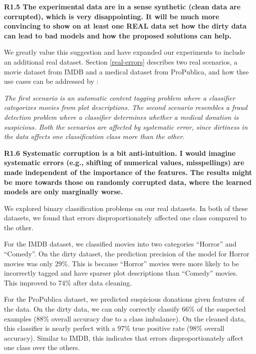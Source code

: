 \vspace{0.5em}

\noindent\textbf{R1.5 The experimental data are in a sense synthetic (clean data are corrupted), which is very disappointing. It will be much more convincing to show on at least one REAL data set how the dirty data can lead to bad models and how the proposed solutions can help.}

\noindent We greatly value this suggestion and have expanded our experiments to include an additional real dataset.
Section \ref{real-errors} describes two real scenarios, a movie dataset from IMDB and a medical dataset from ProPublica, and how thse use cases can be addressed by \sys:

\emph{The first scenario is an automatic content tagging problem where a classifier categorizes movies from plot descriptions.
The second scenario resembles a fraud detection problem where a classifier determines whether a medical donation is suspicious.
Both the scenarios are affected by systematic error, since dirtiness in the data affects one classification class more than the other.}

\vspace{0.5em}

\noindent\textbf{R1.6 Systematic corruption is a bit anti-intuition. I would imagine systematic errors (e.g., shifting of numerical values, misspellings) are made independent of the importance of the features. The results might be more towards those on randomly corrupted data, where the learned models are only marginally worse.}

\noindent  We explored binary classification problems on our real datasets. In both of these datasets, we found that errors disproportionately affected one class compared to the other.

For the IMDB dataset, we classified movies into two categories ``Horror'' and ``Comedy''. 
On the dirty dataset, the prediction precision of the model for Horror movies was only 29\%.
This is because ``Horror'' movies were more likely to be incorrectly tagged and have sparser plot descriptions than ``Comedy'' movies.
This improved to 74\% after data cleaning. 

For the ProPublica dataset, we predicted suspicious donations given features of the data.  
On the dirty data, we can only correctly classify 66\% of the suspected examples (88\% overall accuracy due to a class imbalance).
On the cleaned data, this classifier is nearly perfect with a 97\% true positive rate (98\% overall accuracy).
Similar to IMDB, this indicates that errors disproportionately affect one class over the others.

